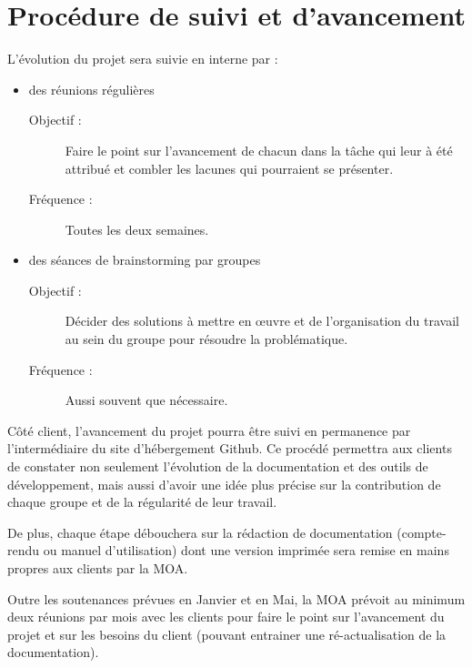 \documentclass{../../res/univ-projet}
\begin{document}
\section{Procédure de suivi et d'avancement}
	L'évolution du projet sera suivie en interne par : 
	\begin{itemize}
		\item des réunions régulières 
		\begin{description}
			\item[Objectif :] Faire le point sur l'avancement de chacun dans la tâche qui leur à été attribué et combler les lacunes qui pourraient se présenter.
			\item[Fréquence :] Toutes les deux semaines.
		\end{description}
		\item des séances de brainstorming par groupes
		\begin{description}
			\item[Objectif :] Décider des solutions à mettre en œuvre et de l'organisation du travail au sein du groupe pour résoudre la problématique.
			\item[Fréquence :] Aussi souvent que nécessaire.
		\end{description}
	\end{itemize}

	Côté client, l'avancement du projet pourra être suivi en permanence par l'intermédiaire du site d'hébergement Github. Ce procédé permettra aux clients de constater non seulement l'évolution de la documentation et des outils de développement, mais aussi d'avoir une idée plus précise sur la contribution de chaque groupe et de la régularité de leur travail.

	De plus, chaque étape débouchera sur la rédaction de documentation (compte-rendu ou manuel d'utilisation) dont une version imprimée sera remise en mains propres aux clients par la MOA.

	Outre les soutenances prévues en Janvier et en Mai, la MOA prévoit au minimum deux réunions par mois avec les clients pour faire le point sur l'avancement du projet et sur les besoins du client (pouvant entrainer une ré-actualisation de la documentation).

\end{document}
